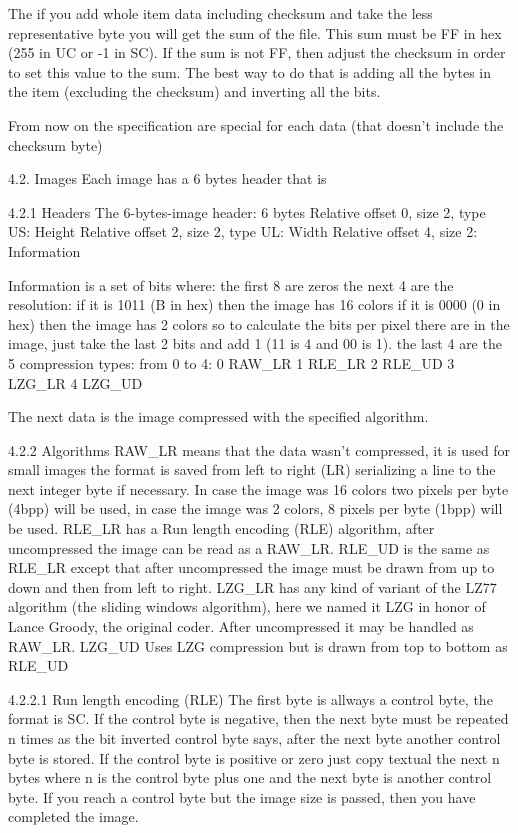  The if you add whole item data including checksum and take the less
 representative byte you will get the sum of the file. This sum must be FF
 in hex (255 in UC or -1 in SC). If the sum is not FF, then adjust the
 checksum in order to set this value to the sum. The best way to do that is
 adding all the bytes in the item (excluding the checksum) and inverting
 all the bits.

 From now on the specification are special for each data (that doesn't
 include the checksum byte)

4.2. Images
 Each image has a 6 bytes header that is

4.2.1 Headers
 The 6-bytes-image header: 6 bytes
  Relative offset 0, size 2, type US: Height
  Relative offset 2, size 2, type UL: Width 
  Relative offset 4, size 2: Information

 Information is a set of bits where:
  the first 8 are zeros
  the next 4 are the resolution:
   if it is 1011 (B in hex) then the image has 16 colors
   if it is 0000 (0 in hex) then the image has 2 colors
   so to calculate the bits per pixel there are in the image, just take the
   last 2 bits and add 1 (11 is 4 and 00 is 1).
  the last 4 are the 5 compression types:
   from 0 to 4:
   0 RAW_LR
   1 RLE_LR
   2 RLE_UD
   3 LZG_LR
   4 LZG_UD

 The next data is the image compressed with the specified algorithm.

4.2.2 Algorithms
 RAW_LR means that the data wasn't compressed, it is used for small images
        the format is saved from left to right (LR) serializing a line to
        the next integer byte if necessary. In case the image was 16 colors
        two pixels per byte (4bpp) will be used, in case the image was 2
        colors, 8 pixels per byte (1bpp) will be used.
 RLE_LR has a Run length encoding (RLE) algorithm, after uncompressed the
        image can be read as a RAW_LR.
 RLE_UD is the same as RLE_LR except that after uncompressed the image must
        be drawn from up to down and then from left to right.
 LZG_LR has any kind of variant of the LZ77 algorithm (the sliding windows
        algorithm), here we named it LZG in honor of Lance Groody, the
        original coder.
        After uncompressed it may be handled as RAW_LR.
 LZG_UD Uses LZG compression but is drawn from top to bottom as RLE_UD

4.2.2.1 Run length encoding (RLE)
 The first byte is allways a control byte, the format is SC. If the control
 byte is negative, then the next byte must be repeated n times as the bit
 inverted control byte says, after the next byte another control byte is
 stored.
 If the control byte is positive or zero just copy textual the next n bytes
 where n is the control byte plus one and the next byte is another control
 byte.
 If you reach a control byte but the image size is passed, then you have
 completed the image.

